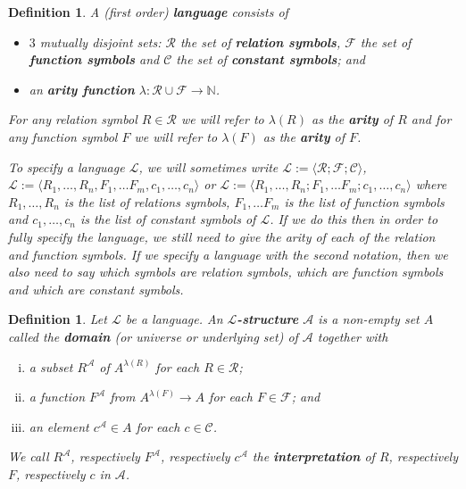 \documentclass[11pt]{article}
\newtheorem{definition}[theorem]{Definition}
\newcommand{\mcal}[1]{\mathcal{#1}}
\newcommand{\N}{\mathbb{N}}
\begin{document}
\begin{definition}
A (first order) \textbf{language} consists of
\begin{itemize}
\item $3$ mutually disjoint sets: $\mcal{R}$ the set of \textbf{relation symbols}, $\mcal{F}$ the set of \textbf{function symbols} and $\mcal{C}$ the set of \textbf{constant symbols}; and
\item  an \textbf{arity function} $\lambda:\mcal{R}\cup\mcal{F}\rightarrow \N$.
\end{itemize}
For any relation symbol $R\in \mcal{R}$ we will refer to $\lambda(R)$ as the \textbf{arity} of $R$ and for any function symbol $F$ we will refer to $\lambda(F)$ as the \textbf{arity} of $F$.

To specify a language $\mcal{L}$, we will sometimes write $\mcal{L}:=\langle \mcal{R}; \mcal{F}; \mcal{C}\rangle$, $\mcal{L}:=\langle R_1,\ldots,R_n, F_1,\ldots F_m, c_1,\ldots, c_n\rangle$ or $\mcal{L}:=\langle R_1,\ldots,R_n; F_1,\ldots F_m; c_1,\ldots, c_n\rangle$ where $R_1,\ldots,R_n$ is the list of relations symbols, $F_1,\ldots F_m$ is the list of function symbols and $c_1,\ldots, c_n$ is the list of constant symbols of $\mcal{L}$. If we do this then in order to fully specify the language, we still need to give the arity of each of the relation and function symbols. If we specify a language with the second notation, then we also need to say which symbols are relation symbols, which are function symbols and which are constant symbols.
\end{definition}

\begin{definition}
Let $\mcal{L}$ be a language. An \textbf{$\mcal{L}$-structure} $\mcal{A}$ is a non-empty set $A$ called the \textbf{domain} (or universe or underlying set) of $\mcal{A}$ together with
\begin{enumerate}[(i)]
\item a subset $R^\mcal{A}$ of $A^{\lambda(R)}$ for each $R\in \mcal{R}$;
\item a function $F^\mcal{A}$ from $A^{\lambda(F)}\rightarrow A$ for each $F\in\mcal{F}$; and
\item an element $c^\mcal{A}\in A$ for each $c\in\mcal{C}$.
\end{enumerate}
We call $R^\mcal{A}$, respectively $F^\mcal{A}$, respectively $c^\mcal{A}$ the \textbf{interpretation} of $R$, respectively $F$, respectively $c$ in $\mcal{A}$.
\end{definition}
\end{document}
